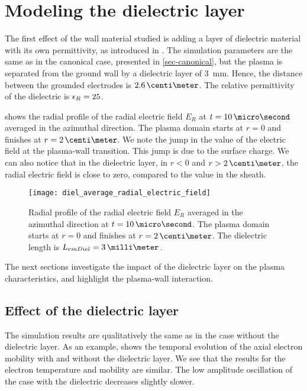 
\section{Modeling the dielectric layer }
  \label{sec-diel_layer}
  
  The first effect of the wall material studied is adding a layer of dielectric material with its own permittivity, as introduced in .
  The simulation parameters are the same as in the canonical case, presented in \cref{sec-canonical}, but the plasma is separated from the ground wall by a dielectric layer of 3~mm.
  Hence, the distance between the grounded electrodes is $2.6\,\centi\meter$.
  The relative permittivity of the dielectric is $\epsilon_{R}=25$.
  
   shows the radial profile of the radial electric field $E_R$ at $t=10\,\micro\second$ averaged in the azimuthal direction.
  The plasma domain starts at $r=0$ and finishes at $r=2\,\centi\meter$.
  We note the jump in the value of the electric field at the plasma-wall transition.
  This jump is due to the surface charge.
  We can also notice that in the dielectric layer, in $r < 0$ and $r > 2\,\centi\meter$, the radial electric field is close to zero, compared to the value in the sheath.
  
  \begin{figure}[hbt]
    \centering
    \texttt{[image: diel\_average\_radial\_electric\_field]}
    \caption{Radial profile of the radial electric field $E_R$ averaged in the azimuthal direction at $t=10\,\micro\second$. The plasma domain starts at $r=0$ and finishes at $r=2\,\centi\meter$. The dielectric length is $L_{\\rm Diel} = 3\,\milli\meter$.  }
    \label{fig-diel_radial_Er}
  \end{figure}
  
  The next sections investigate the impact of the dielectric layer on the plasma characteristics, and highlight the plasma-wall interaction.
  
  \subsection{Effect of the dielectric layer} \label{subsec-effect_mob}
    
  
  The simulation results are qualitatively the same as in the case without the dielectric layer.
  As an example,  shows the temporal evolution of the axial electron mobility with and without the dielectric layer.
  We see that the results for the electron temperature and mobility are similar.
  The low amplitude oscillation of the case with the dielectric decreases slightly slower.
  

